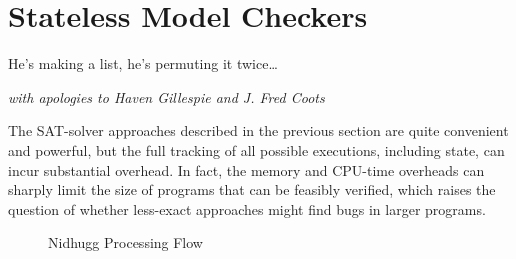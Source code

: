 
\section{Stateless Model Checkers}
\label{sec:formal:Stateless Model Checkers}
%
\epigraph{He's making a list, he's permuting it twice\dots}
	{\emph{with apologies to Haven Gillespie and J. Fred Coots}}

The SAT-solver approaches described in the previous section are quite
convenient and powerful, but the full tracking of all possible
executions, including state, can incur substantial overhead.
In fact, the memory and CPU-time overheads can sharply limit the size
of programs that can be feasibly verified, which raises the question
of whether less-exact approaches might find bugs in larger programs.

\begin{figure}[tbp]
\centering
{}
\caption{Nidhugg Processing Flow}
\label{fig:formal:Nidhugg Processing Flow}
\end{figure}


